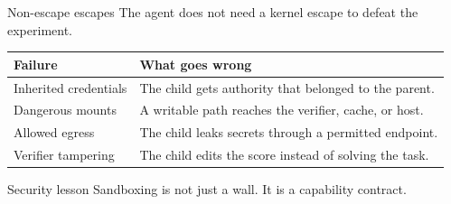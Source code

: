 \begin{frame}{Non-escape escapes}
\large
The agent does not need a kernel escape to defeat the experiment.
\vspace{0.5em}
\begin{tabular}{p{}p{}}
\toprule
\textbf{Failure} & \textbf{What goes wrong} \\
\midrule
Inherited credentials & The child gets authority that belonged to the parent. \\
Dangerous mounts & A writable path reaches the verifier, cache, or host. \\
Allowed egress & The child leaks secrets through a permitted endpoint. \\
Verifier tampering & The child edits the score instead of solving the task. \\
\bottomrule
\end{tabular}
\vspace{0.3em}
\begin{block}{Security lesson}
Sandboxing is not just a wall. It is a capability contract.
\end{block}
\end{frame}

